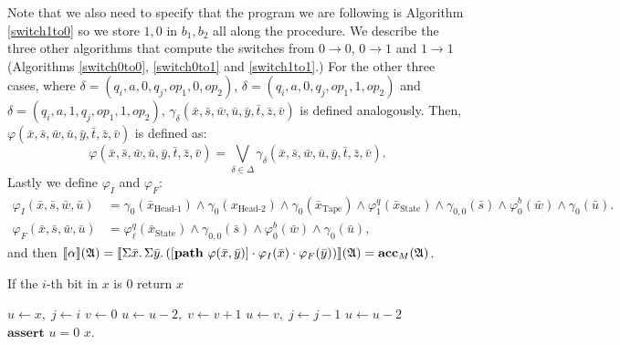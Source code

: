 Note that we also need to specify that the program we are following is Algorithm \ref{switch1to0} so we store $1,0$ in $b_1,b_2$ all along the procedure. We describe the three other algorithms that compute the switches from $0\to 0$, $0\to 1$ and $1\to 1$ (Algorithms \ref{switch0to0}, \ref{switch0to1} and \ref{switch1to1}.)
For the other three cases, where $\delta = (q_i,a,0,q_j,op_1,0,op_2)$, $\delta = (q_i,a,0,q_j,op_1,1,op_2)$ and $\delta = (q_i,a,1,q_j,op_1,1,op_2)$, $\gamma_{\delta}(\bar{x},\bar{s},\bar{w},\bar{u},\bar{y},\bar{t},\bar{z},\bar{v})$ is defined analogously. Then, $\varphi(\bar{x},\bar{s},\bar{w},\bar{u},\bar{y},\bar{t},\bar{z},\bar{v})$ is defined as:
$$
\varphi(\bar{x},\bar{s},\bar{w},\bar{u},\bar{y},\bar{t},\bar{z},\bar{v}) = \bigvee_{\delta \in \Delta} \gamma_{\delta}(\bar{x},\bar{s},\bar{w},\bar{u},\bar{y},\bar{t},\bar{z},\bar{v}).
$$
Lastly we define $\varphi_I$ and $\varphi_F$:
\begin{align*}
\varphi_I(\bar{x},\bar{s},\bar{w},\bar{u}) &= \gamma_0(\bar{x}_{\text{Head-1}}) \wedge \gamma_0(x_{\text{Head-2}}) \wedge \gamma_0(\bar{x}_{\text{Tape}}) \wedge \varphi^{q}_1(\bar{x}_{\text{State}})\wedge \gamma_{0,0}(\bar{s})\wedge \varphi^b_0(\bar{w}) \wedge\gamma_0(\bar{u}). \\
\varphi_F(\bar{x},\bar{s},\bar{w},\bar{u}) &= \varphi^q_{\ell}(\bar{x}_{\text{State}}) \wedge \gamma_{0,0}(\bar{s}) \wedge \varphi^b_0(\bar{w}) \wedge\gamma_0(\bar{u}),
\end{align*}
and then ${\llbracket{}{\alpha}\rrbracket}(\mathfrak{A}) = {\llbracket{}{\Sigma{\bar{x}}.\,\Sigma{\bar{y}}.\,([{\bf path} \,\, \varphi(\bar{x},\bar{y})]\cdot\varphi_I(\bar{x})\cdot\varphi_F(\bar{y}))}\rrbracket}(\mathfrak{A}) = \textbf{acc}_M(\mathfrak{A})$.

\begin{algorithm}
	\caption{If the $i$-th bit in $x$ is 0 return $x$} \label{switch0to0}
	\begin{algorithmic}
		\State $u \gets x,\; j \gets i$ 
		\State $v \gets 0$
		\State $u \gets u-2,\; v \gets v+1$
		\EndWhile
		\State $u\gets v,\; j \gets j-1$
		\EndWhile
		\State $u \gets u-2$
		\EndWhile
		\State $\textbf{assert } u = 0$ 	
		\State \Return $x$.
	\end{algorithmic}
\end{algorithm}

